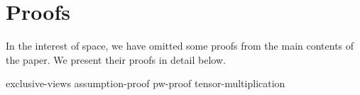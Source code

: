 \section{Proofs}
\label{app:proofs}

In the interest of space, we have omitted some proofs from
the main contents of the paper. 
We present their proofs in detail below.

{exclusive-views}
{assumption-proof}
{pw-proof}
{tensor-multiplication}


